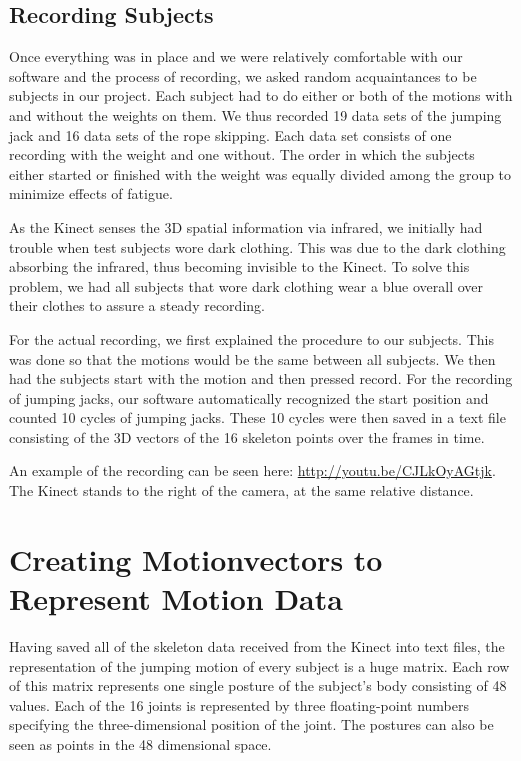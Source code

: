 \documentclass[a4paper]{article}
\begin{document}
\subsection{Recording Subjects}

Once everything was in place and we were relatively comfortable with our software and the process of recording, we asked random acquaintances to be subjects in our project.
Each subject had to do either or both of the motions with and without the weights on them.
We thus recorded 19 data sets of the jumping jack and 16 data sets of the rope skipping.
Each data set consists of one recording with the weight and one without.
The order in which the subjects either started or finished with the weight was equally divided among the group to minimize effects of fatigue.

As the Kinect senses the 3D spatial information via infrared, we initially had trouble when test subjects wore dark clothing.
This was due to the dark clothing absorbing the infrared, thus becoming invisible to the Kinect.
To solve this problem, we had all subjects that wore dark clothing wear a blue overall over their clothes to assure a steady recording.

For the actual recording, we first explained the procedure to our subjects.
This was done so that the motions would be the same between all subjects.
We then had the subjects start with the motion and then pressed record.
For the recording of jumping jacks, our software automatically recognized the start position and counted 10 cycles of jumping jacks.
These 10 cycles were then saved in a text file consisting of the 3D vectors of the 16 skeleton points over the frames in time.

An example of the recording can be seen here: \url{http://youtu.be/CJLkOyAGtjk}. The Kinect stands to the right of the camera, at the same relative distance.

\section{Creating Motionvectors to Represent Motion Data}

Having saved all of the skeleton data received from the Kinect into text files, the representation of the jumping motion of every subject is a huge matrix.
Each row of this matrix represents one single posture of the subject's body consisting of 48 values.
Each of the 16 joints is represented by three floating-point numbers specifying the three-dimensional position of the joint.
The postures can also be seen as points in the 48 dimensional space.
\end{document}
